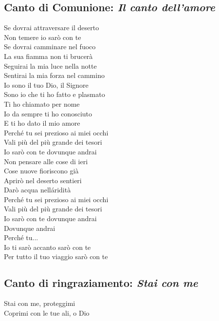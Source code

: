\subsection*{Canto di Comunione: \textit{Il canto dell'amore}}

	\begin{mystrofe}
		Se dovrai attraversare il deserto \\
		Non temere io sarò con te \\
		Se dovrai camminare nel fuoco \\
		La sua fiamma non ti brucerà \\
		Seguirai la mia luce nella notte \\
		Sentirai la mia forza nel cammino \\
		Io sono il tuo Dio, il Signore \\
		Sono io che ti ho fatto e plasmato \\
		Ti ho chiamato per nome \\
		Io da sempre ti ho conosciuto \\
		E ti ho dato il mio amore \\
		Perché tu sei prezioso ai miei occhi \\
		Vali più del più grande dei tesori \\
		Io sarò con te dovunque andrai \\
		Non pensare alle cose di ieri \\
		Cose nuove fioriscono già \\
		Aprirò nel deserto sentieri \\
		Darò acqua nell\'aridità \\
		Perché tu sei prezioso ai miei occhi \\
		Vali più del più grande dei tesori \\
		Io sarò con te dovunque andrai \\
		Dovunque andrai \\
		Perché tu... \\
		Io ti sarò accanto sarò con te \\
		Per tutto il tuo viaggio sarò con te
	\end{mystrofe}

\subsection*{Canto di ringraziamento: \textit{Stai con me}}

	\begin{mystrofe}
		Stai con me, proteggimi \\
		Coprimi con le tue ali, o Dio \\
	\end{mystrofe}


